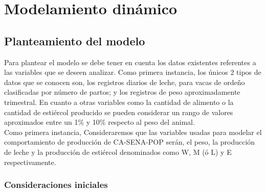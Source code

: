 \pagebreak



\section{Modelamiento dinámico} \label{dinamod}
\subsection{Planteamiento del modelo}

Para plantear el modelo se debe tener en cuenta los datos existentes referentes a las variables que se deseen analizar. Como primera instancia, los únicos 2 tipos de datos que se conocen son, los registros diarios de leche, para vacas de ordeño clasificadas por número de partos; y los registros de peso aproximadamente trimestral. En cuanto a otras variables como la cantidad de alimento o la cantidad de estiércol producido se pueden considerar un rango de valores aproximados entre un 1\% y 10\% respecto al peso del animal. \\

Como primera instancia, Consideraremos que las variables usadas para modelar el comportamiento de producción de CA-SENA-POP serán, el peso, la producción de leche y la producción de estiércol denominados como W, M (ó L) y E respectivamente.

\subsubsection{Consideraciones iniciales}

